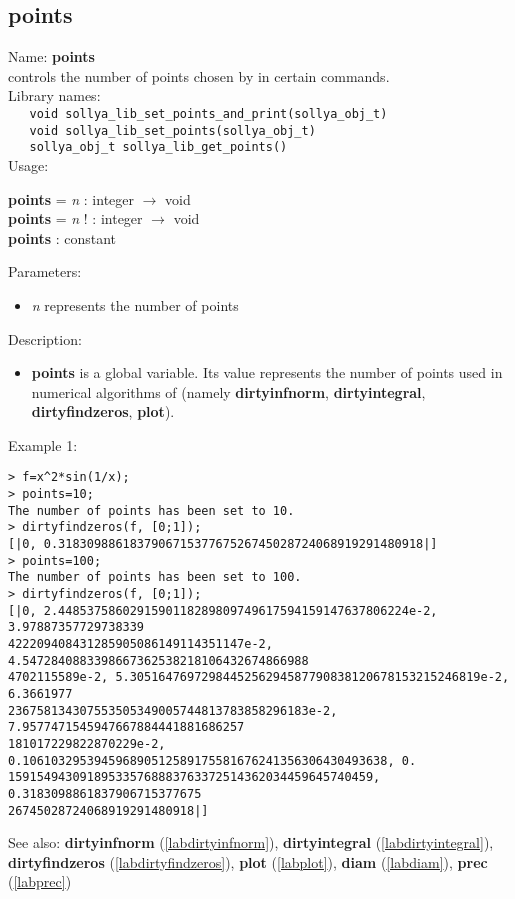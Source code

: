 \subsection{points}
\label{labpoints}
\noindent Name: \textbf{points}\\
\phantom{aaa}controls the number of points chosen by \sollya in certain commands.\\[0.2cm]
\noindent Library names:\\
\verb|   void sollya_lib_set_points_and_print(sollya_obj_t)|\\
\verb|   void sollya_lib_set_points(sollya_obj_t)|\\
\verb|   sollya_obj_t sollya_lib_get_points()|\\[0.2cm]
\noindent Usage: 
\begin{center}
\textbf{points} = \emph{n} : \textsf{integer} $\rightarrow$ \textsf{void}\\
\textbf{points} = \emph{n} ! : \textsf{integer} $\rightarrow$ \textsf{void}\\
\textbf{points} : \textsf{constant}\\
\end{center}
Parameters: 
\begin{itemize}
\item \emph{n} represents the number of points
\end{itemize}
\noindent Description: \begin{itemize}

\item \textbf{points} is a global variable. Its value represents the number of points
   used in numerical algorithms of \sollya (namely \textbf{dirtyinfnorm},
   \textbf{dirtyintegral}, \textbf{dirtyfindzeros}, \textbf{plot}).
\end{itemize}
\noindent Example 1: 
\begin{center}\begin{minipage}{15cm}\begin{Verbatim}[frame=single]
> f=x^2*sin(1/x);
> points=10;
The number of points has been set to 10.
> dirtyfindzeros(f, [0;1]);
[|0, 0.318309886183790671537767526745028724068919291480918|]
> points=100;
The number of points has been set to 100.
> dirtyfindzeros(f, [0;1]);
[|0, 2.4485375860291590118289809749617594159147637806224e-2, 3.97887357729738339
422209408431285905086149114351147e-2, 4.5472840883398667362538218106432674866988
4702115589e-2, 5.3051647697298445256294587790838120678153215246819e-2, 6.3661977
236758134307553505349005744813783858296183e-2, 7.9577471545947667884441881686257
181017229822870229e-2, 0.106103295394596890512589175581676241356306430493638, 0.
159154943091895335768883763372514362034459645740459, 0.3183098861837906715377675
26745028724068919291480918|]
\end{Verbatim}
\end{minipage}\end{center}
See also: \textbf{dirtyinfnorm} (\ref{labdirtyinfnorm}), \textbf{dirtyintegral} (\ref{labdirtyintegral}), \textbf{dirtyfindzeros} (\ref{labdirtyfindzeros}), \textbf{plot} (\ref{labplot}), \textbf{diam} (\ref{labdiam}), \textbf{prec} (\ref{labprec})
